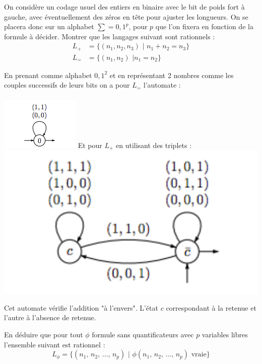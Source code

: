 \documentclass[12pt,letterpaper,boxed]{hmcpset}
\begin{document}
\begin{problem} [Question 2]
On considère un codage usuel des entiers en binaire avec le bit de poids fort à
gauche, avec éventuellement des zéros en tête pour ajuster les longueurs. On se placera
donc sur un alphabet $\sum = {0, 1}^{p}$, pour $p$ que l’on fixera en fonction de la
formule à décider. Montrer que les langages suivant sont rationnels :
\begin{align*}
L_{+} & = \{(n_{1},n_{2},n_{3}) \, \, | \, \, n_{1} + n_{2} = n_{3} \} \\
L_{=} & = \{(n_{1}, n_{2}) \, \, | n_{1} = n_{2}\}
\end{align*}


\end{problem}
\begin{solution}
En prenant comme alphabet ${0,1}^2$ et en représentant 2 nombres comme les couples successifs de leurs bits on a pour $L_{=}$ l'automate :  \\ \\
\includegraphics{1}
\newpage
Et pour $L_{+}$ en utilisant des triplets :  \\

\includegraphics{2}

Cet automate vérifie l'addition "à l'envers". L'état $c$ correspondant à la retenue et l'autre à l'absence de retenue.

\end{solution}

\begin{problem}[Question 3]
En déduire que pour tout $\phi$ formule sans quantificateurs avec $p$ variables libres l'ensemble suivant est rationnel : \\
$$ L_{\phi} = \{ (n_{1}, \, n_{2}, \, \dots , \, n_{p}) \, \, | \, \, \phi(n_{1}, \, n_{2}, \, \dots , \, n_{p}) \text{ vraie} \}$$

\end{problem}
\end{document}
